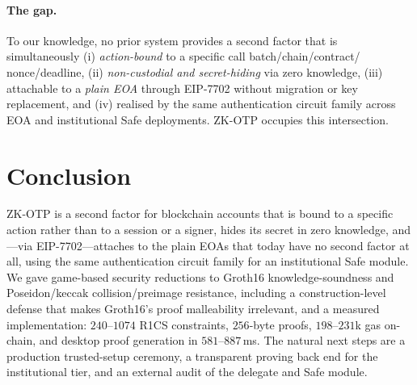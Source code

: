 \documentclass[11pt]{article}
\theoremstyle{definition}
\theoremstyle{plain}
\begin{document}
\paragraph{The gap.} To our knowledge, no prior system provides a second factor that
is simultaneously (i) \emph{action-bound} to a specific call batch/chain/contract/
nonce/deadline, (ii) \emph{non-custodial and secret-hiding} via zero knowledge,
(iii) attachable to a \emph{plain EOA} through EIP-7702 without migration or key
replacement, and (iv) realised by the same authentication circuit family across EOA
and institutional Safe deployments. ZK-OTP occupies this intersection.

\section{Conclusion}
ZK-OTP is a second factor for blockchain accounts that is bound to a specific action
rather than to a session or a signer, hides its secret in zero knowledge, and---via
EIP-7702---attaches to the plain EOAs that today have no second factor at all, using
the same authentication circuit family for an institutional Safe module. We gave game-based
security reductions to Groth16 knowledge-soundness and Poseidon/keccak
collision/preimage resistance, including a construction-level defense that makes
Groth16's proof malleability irrelevant, and a measured implementation:
$240$--$1074$ R1CS constraints, $256$-byte proofs, $198$--$231$k gas on-chain, and
desktop proof generation in $581$--$887$\,ms. The natural next steps are a production trusted-setup
ceremony, a transparent proving back end for the institutional tier, and an external
audit of the delegate and Safe module.
\end{document}

